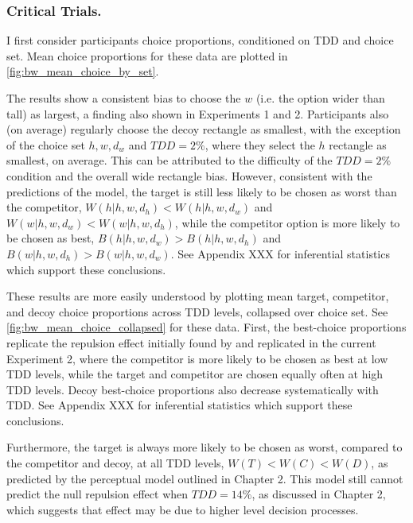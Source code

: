 \subsubsection{Critical Trials.}
I first consider participants choice proportions, conditioned on TDD and choice set. Mean choice proportions for these data are plotted in \ref{fig:bw_mean_choice_by_set}. 

The results show a consistent bias to choose the $w$ (i.e. the option wider than tall) as largest, a finding also shown in Experiments 1 and 2. Participants also (on average) regularly choose the decoy rectangle as smallest, with the exception of the choice set $h,w,d_{w}$ and $TDD=2\%$, where they select the $h$ rectangle as smallest, on average. This can be attributed to the difficulty of the $TDD=2\%$ condition and the overall wide rectangle bias. However, consistent with the predictions of the model, the target is still less likely to be chosen as worst than the competitor, $W(h|{h,w,d_{h}})<W(h|{h,w,d_{w}})$ and $W(w|{h,w,d_{w}})<W(w|{h,w,d_{h}})$, while the competitor option is more likely to be chosen as best, $B(h|{h,w,d_{w}})>B(h|{h,w,d_{h}})$ and $B(w|{h,w,d_{h}})>B(w|{h,w,d_{w}})$. See Appendix XXX for inferential statistics which support these conclusions.

These results are more easily understood by plotting mean target, competitor, and decoy choice proportions across TDD levels, collapsed over choice set. See \ref{fig:bw_mean_choice_collapsed} for these data. First, the best-choice proportions replicate the repulsion effect initially found by \textcite{spektorWhenGoodLooks2018b} and replicated in the current Experiment 2, where the competitor is more likely to be chosen as best at low TDD levels, while the target and competitor are chosen equally often at high TDD levels. Decoy best-choice proportions also decrease systematically with TDD. See Appendix XXX for inferential statistics which support these conclusions. 

Furthermore, the target is always more likely to be chosen as worst, compared to the competitor and decoy, at all TDD levels, $W(T)<W(C)<W(D)$, as predicted by the perceptual model outlined in Chapter 2. This model still cannot predict the null repulsion effect when $TDD=14\%$, as discussed in Chapter 2, which suggests that effect may be due to higher level decision processes.

